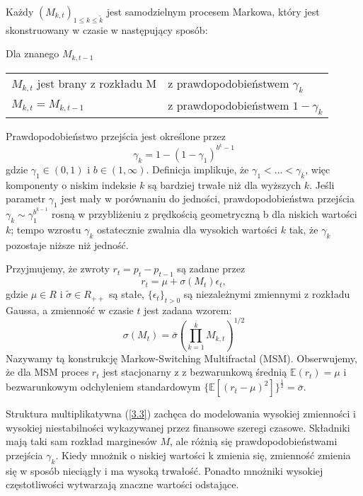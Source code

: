 \documentclass[12pt]{article}
\theoremstyle{definition}
\begin{document}
Każdy $(M_{k, t})_{1 \leq k \leq \tilde{k}}$ jest samodzielnym procesem Markowa, który jest skonstruowany w czasie w następujący sposób:

Dla znanego  $M_{k, t-1}$

\begin{tabular}{l l}
$M_{k, t}$ jest brany z rozkładu M & z prawdopodobieństwem $\gamma_k$\\
$M_{k, t} = M_{k, t-1}$ & z prawdopodobieństwem $1 - \gamma_k$\\
\end{tabular}
Prawdopodobieństwo przejścia jest określone przez
\begin{equation}
\label{3.1}
\gamma_k = 1 - (1 - \gamma_1)^{b^k - 1}
\end{equation}
gdzie $\gamma_1 \in (0, 1)$ i $b \in (1, \infty)$. Definicja implikuje, że $\gamma_1<\ldots<\gamma_{\bar{k}}$, więc komponenty o niskim indeksie $k$ są bardziej trwałe niż dla wyższych $k$. Jeśli parametr $\gamma_1$ jest mały w porównaniu do jedności, prawdopodobieństwa przejścia $\gamma_k\sim \gamma_1 ^{b^{k-1}}$ rosną w przybliżeniu z prędkością geometryczną b dla niskich wartości $k$; tempo wzrostu $\gamma_k$ ostatecznie zwalnia dla wysokich wartości $k$ tak, że $\gamma_k$ pozostaje niższe niż jedność.

Przyjmujemy, że zwroty $r_t = p_t - p_{t-1}$ są zadane przez 
\begin{equation}
\label{3.2}
r_t = \mu + \sigma (M_t)\epsilon_t,
\end{equation}
gdzie $\mu \in R$ i $ \tilde{\sigma} \in R_{++}$ są stałe, $\{\epsilon_t\}_{t>0}$ są niezależnymi zmiennymi z rozkładu Gaussa, a zmienność w czasie $t$ jest zadana wzorem: 
\begin{equation}
\label{3.3}
\sigma(M_t) = \bar{\sigma} (\prod_{k=1}^{\bar{k}} M_{k, t})^{1/2} 
\end{equation}  
Nazywamy tą konstrukcję Markow-Switching Multifractal (MSM). Obserwujemy, że dla MSM proces $r_t$ jest stacjonarny z z bezwarunkową średnią $\mathbb{E}(r_t)=\mu$ i bezwarunkowym odchyleniem standardowym $\{ \mathbb{E}[(r_t-\mu)^2]\}^{\frac{1}{2}} = \bar{\sigma}$.

Struktura multiplikatywna (\ref{3.3}) zachęca do modelowania wysokiej zmienności i wysokiej niestabilności wykazywanej przez finansowe szeregi czasowe. Składniki mają taki sam rozkład marginesów $M$, ale różnią się prawdopodobieństwami przejścia $\gamma_k$. Kiedy mnożnik o niskiej wartości k zmienia się, zmienność zmienia się w sposób nieciągły i ma wysoką trwałość. Ponadto mnożniki wysokiej częstotliwości wytwarzają znaczne wartości odstające.
\end{document}
